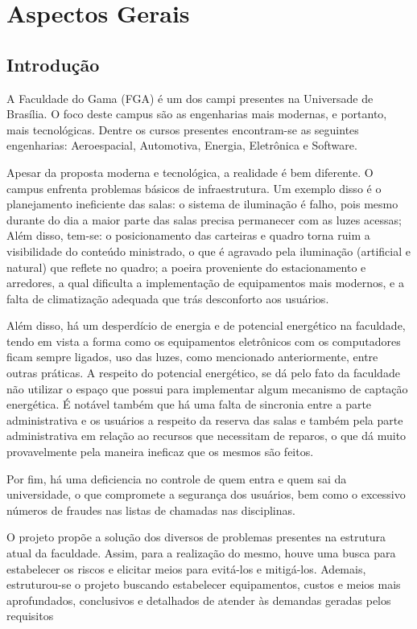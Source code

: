 \part{Aspectos Gerais}
\chapter[Introdução]{Introdução}

A Faculdade do Gama (FGA) é um dos campi presentes na Universade de Brasília. O
foco deste campus são as engenharias mais modernas, e portanto, mais
tecnológicas. Dentre os cursos presentes encontram-se as seguintes engenharias:
Aeroespacial, Automotiva, Energia, Eletrônica e Software.

 Apesar da proposta moderna e tecnológica, a realidade é bem diferente. O campus
 enfrenta problemas básicos de infraestrutura. Um exemplo disso é o planejamento
 ineficiente das salas: o sistema de iluminação é falho, pois mesmo durante do
 dia a maior parte das salas precisa permanecer com as luzes acessas; Além disso, tem-se: o
 posicionamento das carteiras e quadro torna ruim a visibilidade do conteúdo
 ministrado, o que é agravado pela iluminação (artificial e natural) que reflete
 no quadro; a poeira proveniente do estacionamento e arredores, a qual dificulta
 a implementação de equipamentos mais modernos, e a falta de climatização
 adequada que trás desconforto aos usuários.

 Além disso, há um desperdício de energia e de potencial energético na faculdade,
tendo em vista a forma como os equipamentos eletrônicos com os computadores
ficam sempre ligados, uso das luzes, como mencionado anteriormente, entre outras
práticas. A respeito do potencial energético, se dá pelo fato da faculdade não
utilizar o espaço que possui para implementar algum mecanismo de captação
energética. É notável também que há uma falta de sincronia entre a parte
administrativa e os usuários a respeito da reserva das salas e também pela parte
administrativa em relação ao recursos que necessitam de reparos, o que dá muito
provavelmente pela maneira ineficaz que os mesmos são feitos.

Por fim, há uma deficiencia no controle de quem entra e quem sai da
universidade, o que compromete a segurança dos usuários, bem como o excessivo
números de fraudes nas listas de chamadas nas disciplinas.

 O projeto propõe a solução dos diversos de problemas presentes
 na estrutura atual da faculdade. Assim, para a realização do mesmo, houve uma
 busca para estabelecer os riscos e elicitar meios para evitá-los e mitigá-los.
 Ademais, estruturou-se o projeto buscando estabelecer equipamentos, custos e
 meios mais aprofundados, conclusivos e detalhados de atender às demandas
 geradas pelos requisitos

